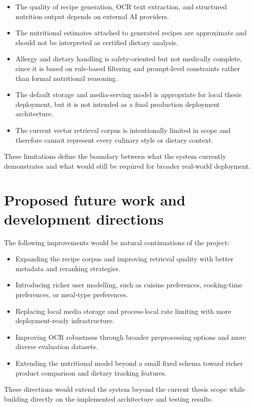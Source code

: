 \begin{itemize}
	\item The quality of recipe generation, OCR text extraction, and
	structured nutrition output depends on external AI providers.
	\item The nutritional estimates attached to generated recipes are
	approximate and should not be interpreted as certified dietary
	analysis.
	\item Allergy and dietary handling is safety-oriented but not
	medically complete, since it is based on rule-based filtering and
	prompt-level constraints rather than formal nutritional reasoning.
	\item The default storage and media-serving model is appropriate for
	local thesis deployment, but it is not intended as a final production
	deployment architecture.
	\item The current vector retrieval corpus is intentionally limited in
	scope and therefore cannot represent every culinary style or dietary
	context.
\end{itemize}

These limitations define the boundary between what the system currently
demonstrates and what would still be required for broader real-world
deployment.

\section{Proposed future work and development directions}

The following improvements would be natural continuations of the
project:

\begin{itemize}
	\item Expanding the recipe corpus and improving retrieval quality with
	better metadata and reranking strategies.
	\item Introducing richer user modelling, such as cuisine preferences,
	cooking-time preferences, or meal-type preferences.
	\item Replacing local media storage and process-local rate limiting
	with more deployment-ready infrastructure.
	\item Improving OCR robustness through broader preprocessing options
	and more diverse evaluation datasets.
	\item Extending the nutritional model beyond a small fixed schema
	toward richer product comparison and dietary tracking features.
\end{itemize}

These directions would extend the system beyond the current thesis
scope while building directly on the implemented architecture and
testing results.
